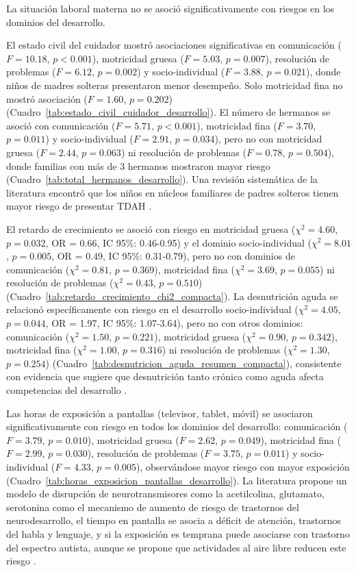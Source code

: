 \documentclass[11pt,letterpaper]{report}
\begin{document}
La situación laboral materna no se asoció significativamente con riesgos en los
dominios del desarrollo.

El estado civil del cuidador mostró asociaciones significativas en comunicación 
($F = 10.18$, $p < 0.001$), motricidad gruesa ($F = 5.03$, $p = 0.007$), 
resolución de problemas ($F = 6.12$, $p = 0.002$) y socio-individual 
($F = 3.88$, $p = 0.021$), donde niños de madres solteras presentaron 
menor desempeño. Solo motricidad fina no mostró asociación ($F = 1.60$, 
$p = 0.202$) (Cuadro~\ref{tab:estado_civil_cuidador_desarrollo}). El número 
de hermanos se asoció con comunicación ($F = 5.71$, $p < 0.001$), motricidad 
fina ($F = 3.70$, $p = 0.011$) y socio-individual ($F = 2.91$, $p = 0.034$), 
pero no con motricidad gruesa ($F = 2.44$, $p = 0.063$) ni resolución de 
problemas ($F = 0.78$, $p = 0.504$), donde familias con más de 3 hermanos 
mostraron mayor riesgo (Cuadro~\ref{tab:total_hermanos_desarrollo}).
Una revisión sistemática de la literatura encontró que los niños en núcleos
familiares de padres solteros tienen mayor riesgo de presentar TDAH
\cite{Claussen2022}.

El retardo de crecimiento se asoció con riesgo en motricidad gruesa
($\chi^2 = 4.60$, $p = 0.032$, OR = 0.66, IC 95\%: 0.46-0.95) y el dominio
socio-individual ($\chi^2 = 8.01$, $p = 0.005$, OR = 0.49, IC 95\%: 0.31-0.79),
pero no con dominios de comunicación ($\chi^2 = 0.81$, $p = 0.369$), motricidad
fina ($\chi^2 = 3.69$, $p = 0.055$) ni resolución de problemas ($\chi^2 = 0.43$, $p = 0.510$) 
(Cuadro~\ref{tab:retardo_crecimiento_chi2_compacta}). La desnutrición aguda 
se relacionó específicamente con riesgo en el desarrollo socio-individual
($\chi^2 = 4.05$, $p = 0.044$, OR = 1.97, IC 95\%: 1.07-3.64), pero no con otros
dominios:  comunicación ($\chi^2 = 1.50$, $p = 0.221$), motricidad gruesa 
($\chi^2 = 0.90$, $p = 0.342$), motricidad fina ($\chi^2 = 1.00$, $p = 0.316$) 
ni resolución de problemas ($\chi^2 = 1.30$, $p = 0.254$) 
(Cuadro~\ref{tab:desnutricion_aguda_resumen_compacta}), consistente con 
evidencia que sugiere que desnutrición tanto crónica como aguda afecta
competencias del desarrollo \cite{Babikako2022,Suryawan2021,vandenHeuvel2019}.

Las horas de exposición a pantallas (televisor, tablet, móvil) se asociaron
significativamente con riesgo en todos los dominios del desarrollo: comunicación
($F = 3.79$, $p = 0.010$), motricidad gruesa ($F = 2.62$, $p = 0.049$),
motricidad fina ($F = 2.99$, $p = 0.030$), resolución de problemas ($F = 3.75$,
$p = 0.011$) y  socio-individual ($F = 4.33$, $p = 0.005$), observándose mayor
riesgo con mayor exposición (Cuadro~\ref{tab:horas_exposicion_pantallas_desarrollo}). La literatura propone un modelo de disrupción de neurotransmisores como la acetilcolina, glutamato, serotonina como el mecanismo de aumento de
riesgo de trastornos del neurodesarrollo, el tiempo en pantalla se asocia a
déficit de atención, trastornos del habla y lenguaje, y si la exposición
es temprana puede asociarse con trastorno del espectro autista, aunque se
propone que actividades al aire libre reducen este riesgo \cite{Priyadarshini2025,Zehra2025,Hill2024,Sarfraz2023,Amorim2023,Sugiyama2023,Goswami2023,Jourdren2023}.
\end{document}
